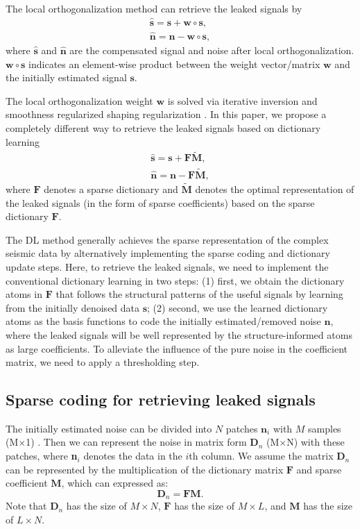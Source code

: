 The local orthogonalization method can retrieve the leaked signals by
\begin{align}
\label{eq:sn1}
\hat{\mathbf{s}} = \mathbf{s} + \mathbf{w} \circ \mathbf{s}, \\
\label{eq:sn2}
\hat{\mathbf{n}} = \mathbf{n} - \mathbf{w} \circ \mathbf{s}, 
\end{align}
where $\hat{\mathbf{s}}$ and $\hat{\mathbf{n}}$ are the compensated signal and noise after local orthogonalization. $\mathbf{w} \circ \mathbf{s}$ indicates an element-wise product between the weight vector/matrix $\mathbf{w}$ and the initially estimated signal $\mathbf{s}$. 

The local orthogonalization weight $\mathbf{w}$ is solved via iterative inversion and smoothness regularized shaping regularization \cite[]{yangkang2015ortho}. In this paper, we propose a completely different way to retrieve the leaked signals based on dictionary learning\wen{:} 
\begin{align}
\label{eq:sn1}
\hat{\mathbf{s}} = \mathbf{s} + \mathbf{F}\tilde{\mathbf{M}}, \\
\label{eq:sn2}
\hat{\mathbf{n}} = \mathbf{n} - \mathbf{F}\tilde{\mathbf{M}}, 
\end{align}
where $\mathbf{F}$ denotes a sparse dictionary and $\tilde{\mathbf{M}}$ denotes the optimal representation of the leaked signals (in the form of sparse coefficients) based on the sparse dictionary $\mathbf{F}$. 

The DL method generally achieves the sparse representation of the complex seismic data by alternatively implementing the sparse coding and dictionary update steps. Here, to retrieve the leaked signals, we need to implement the conventional dictionary learning in two steps: (1) first, we obtain the dictionary atoms in $\mathbf{F}$ that follows the structural patterns of the useful signals by learning from the initially denoised data $\mathbf{s}$; (2) second, we use the learned dictionary atoms as the basis functions to code the initially estimated/removed noise $\mathbf{n}$, where the leaked signals will be well represented by the structure-informed atoms as large coefficients. To alleviate the influence of the pure noise in the coefficient matrix, we need to apply a thresholding step. 

\subsection{Sparse coding for retrieving leaked signals}
The initially estimated noise can be divided into $N$ patches $\textbf{n}_{i}$ with $M$ samples (M$\times$1) . Then we can represent the noise in matrix form $\textbf{D}_{n}$ (M$\times$N) with these patches, where \textbf{n}$_{i}$ denotes the data in the $i$th column. We assume the matrix $\textbf{D}_{n}$ can be represented by the multiplication of the dictionary matrix $\mathbf{F}$ and sparse coefficient $\textbf{M}$, which can expressed as:
\begin{equation}
\textbf{D}_{n}=\mathbf{F}\textbf{M}.
\end{equation}
Note that $\textbf{D}_{n}$ has the size of $M\times N$, $\mathbf{F}$ has the size of $M\times L$, and $\textbf{M}$ has the size of $L\times N$. 


